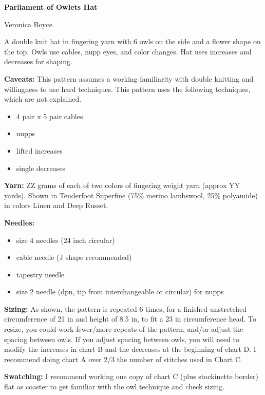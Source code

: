 \documentclass[11pt]{article}
\begin{document}
\begin{centering}
	
\textbf{\LARGE Parliament of Owlets Hat}
\medskip

{\large Veronica Boyce}

\smallskip

\end{centering}


A double knit hat in fingering yarn with 6 owls on the side and a flower shape on the top. Owls use cables, nupp eyes, and color changes. Hat uses increases and decreases for shaping. 
\smallskip

\textbf{Caveats:} This pattern assumes a working familiarity with double knitting and willingness to use hard techniques. This pattern uses the following techniques, which are not explained.
\begin{itemize}
	\item 4 pair x 5 pair cables
	\item nupps
	\item lifted increases
	\item single decreases
\end{itemize}

\smallskip
\textbf{Yarn:} ZZ grams of each of two colors of fingering weight yarn (approx YY yards). Shown in Tenderfoot Superfine (75\% merino lambswool, 25\% polyamide) in colors Linen and Deep Russet. 

\smallskip
\textbf{Needles:} \begin{itemize}
	\item size 4 needles (24 inch circular)
	\item cable needle (J shape recommended)
	\item tapestry needle
	\item size 2 needle (dpn, tip from interchangeable or circular) for nupps
\end{itemize}

\smallskip
\textbf{Sizing:} As shown, the pattern is repeated 6 times, for a finished unstretched circumference of 21 in and height of 8.5 in, to fit a 23 in circumference head. To resize, you could work fewer/more repeats of the pattern, and/or adjust the spacing between owls. If you adjust spacing between owls, you will need to modify the increases in chart B and the decreases at the beginning of chart D. I recommend doing chart A over 2/3 the number of stitches used in Chart C. 

\smallskip
\textbf{Swatching:} I recommend working one copy of chart C (plus stockinette border) flat as coaster to get familiar with the owl technique and check sizing. 
\end{document}
